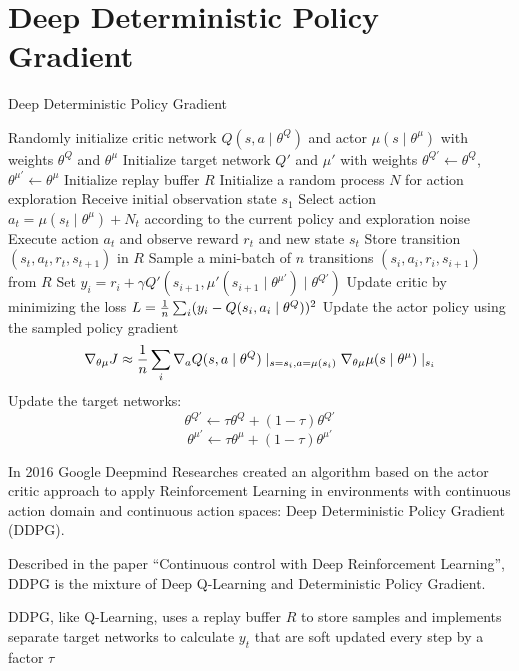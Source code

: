 \documentclass[Lau,oneside,noexaminfo]{sapthesis} %
\begin{document}
\chapter{Deep Deterministic Policy Gradient}
\label{DDPG}
\begin{algorithm}[H]
    \caption{Deep Deterministic Policy Gradient}
\begin{algorithmic}[0]
\STATE Randomly initialize critic network $Q(s,a\mid\theta^Q)$ and actor $\mu(s\mid\theta^\mu)$ with weights $\theta^Q$ and $\theta^\mu$
\STATE Initialize target network $Q'$ and $\mu'$ with weights $\theta^{Q'} \gets \theta^{Q}$, $\theta^{\mu'} \gets \theta^{\mu}$
\STATE Initialize replay buffer $R$
    \STATE Initialize a random process $N$ for action exploration
    \STATE Receive initial observation state $s_1$
        \STATE Select action $a_t=\mu(s_t \mid \theta^\mu) + N_t$ according to the current policy and exploration noise
       	\STATE Execute action $a_t$ and observe reward $r_t$ and new state $s_t$
        \STATE Store transition $(s_t, a_t, r_t, s_{t+1})$ in $R$
        \STATE Sample a mini-batch of $n$ transitions $(s_i, a_i, r_i, s_{i+1})$ from $R$
        \STATE Set $y_i = r_i + \gamma Q'(s_{i+1}, \mu'(s_{i+1} \mid \theta^{\mu'})\mid \theta^{Q'})$
        \STATE Update critic by minimizing the loss $L={1 \over n} \sum_i (y_i - Q(s_i, a_i \mid \theta^Q))^2$
        \STATE Update the actor policy using the sampled policy gradient $$ \nabla_{\theta \mu}J \approx {1 \over n} \sum_i \nabla_a Q(s,a \mid \theta^Q) \mid_{s=s_i, a=\mu(s_i)} \nabla_{\theta \mu} \mu(s \mid \theta^\mu) \mid_{s_i}$$
        \STATE Update the target networks: $$\theta^{Q'} \gets \tau \theta^{Q} + (1-\tau)\theta^{Q'}$$ $$\theta^{\mu'} \gets \tau \theta^{\mu} + (1-\tau)\theta^{\mu'}$$
    \ENDFOR
\ENDFOR
\end{algorithmic}
\end{algorithm}
In 2016 Google Deepmind Researches created an algorithm based on the actor critic approach to apply Reinforcement Learning in environments with continuous action domain and continuous action spaces: Deep Deterministic Policy Gradient (DDPG).

Described in the paper “Continuous control with Deep Reinforcement Learning”, DDPG is the mixture of Deep Q-Learning and Deterministic Policy Gradient.\cite{DDPG}

DDPG, like Q-Learning, uses a replay buffer $R$ to store samples and implements separate target networks to calculate $y_t$ that are soft updated every step by a factor $\tau$\
\end{document}
